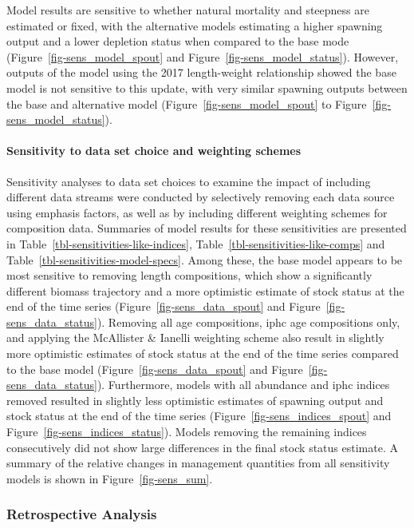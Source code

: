 \documentclass[
]{scrartcl}
\let\oldparagraph\paragraph
\renewcommand{\paragraph}[1]{\oldparagraph{#1}\mbox{}}
\begin{document}
Model results are sensitive to whether natural mortality and steepness
are estimated or fixed, with the alternative models estimating a higher
spawning output and a lower depletion status when compared to the base
mode (Figure~\ref{fig-sens_model_spout} and
Figure~\ref{fig-sens_model_status}). However, outputs of the model using
the 2017 length-weight relationship showed the base model is not
sensitive to this update, with very similar spawning outputs between the
base and alternative model (Figure~\ref{fig-sens_model_spout} to
Figure~\ref{fig-sens_model_status}).

\paragraph{Sensitivity to data set choice and weighting
schemes}\label{sensitivity-to-data-set-choice-and-weighting-schemes}

Sensitivity analyses to data set choices to examine the impact of
including different data streams were conducted by selectively removing
each data source using emphasis factors, as well as by including
different weighting schemes for composition data. Summaries of model
results for these sensitivities are presented in
Table~\ref{tbl-sensitivities-like-indices},
Table~\ref{tbl-sensitivities-like-comps} and
Table~\ref{tbl-sensitivities-model-specs}. Among these, the base model
appears to be most sensitive to removing length compositions, which show
a significantly different biomass trajectory and a more optimistic
estimate of stock status at the end of the time series
(Figure~\ref{fig-sens_data_spout} and
Figure~\ref{fig-sens_data_status}). Removing all age compositions,
\gls{iphc} age compositions only, and applying the McAllister \& Ianelli
weighting scheme also result in slightly more optimistic estimates of
stock status at the end of the time series compared to the base model
(Figure~\ref{fig-sens_data_spout} and
Figure~\ref{fig-sens_data_status}). Furthermore, models with all
abundance and \gls{iphc} indices removed resulted in slightly less
optimistic estimates of spawning output and stock status at the end of
the time series (Figure~\ref{fig-sens_indices_spout} and
Figure~\ref{fig-sens_indices_status}). Models removing the remaining
indices consecutively did not show large differences in the final stock
status estimate. A summary of the relative changes in management
quantities from all sensitivity models is shown in
Figure~\ref{fig-sens_sum}.

\subsubsection{Retrospective Analysis}\label{retrospective-analysis}
\end{document}
